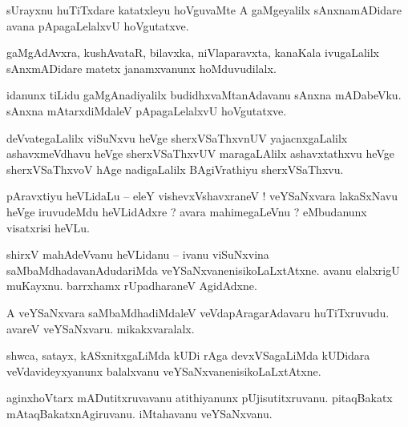 \documentclass{article}
\begin{document}
\begin{mn}%
sUrayxnu huTiTxdare katatxleyu hoVguvaMte A gaMgeyalilx sAnxnamADidare avana pApagaLelalxvU 
hoVgutatxve.
\end{mn}

\begin{mn}%
gaMgAdAvxra, kushAvataR, bilavxka, niVlaparavxta, kanaKala ivugaLalilx sAnxmADidare matetx 
janamxvanunx hoMduvudilalx.
\end{mn}

\begin{mn}%
idanunx tiLidu gaMgAnadiyalilx budidhxvaMtanAdavanu sAnxna mADabeVku. sAnxna mAtarxdiMdaleV 
pApagaLelalxvU hoVgutatxve.
\end{mn}

\begin{mn}%
deVvategaLalilx viSuNxvu heVge sherxVSaThxvnUV yajacnxgaLalilx ashavxmeVdhavu heVge sherxVSaThxvUV 
maragaLAlilx ashavxtathxvu heVge sherxVSaThxvoV hAge nadigaLalilx BAgiVrathiyu sherxVSaThxvu.
\end{mn}


\begin{mn}%
pAravxtiyu heVLidaLu -- eleY vishevxVshavxraneV ! veYSaNxvara lakaSxNavu heVge iruvudeMdu 
heVLidAdxre ? avara mahimegaLeVnu ? eMbudanunx visatxrisi heVLu.
\end{mn}

\begin{mn}%
shirxV mahAdeVvanu heVLidanu -- ivanu viSuNxvina saMbaMdhadavanAdudariMda 
veYSaNxvanenisikoLaLxtAtxne. avanu elalxrigU muKayxnu. barrxhamx rUpadharaneV AgidAdxne.
\end{mn}

\begin{mn}%
A veYSaNxvara saMbaMdhadiMdaleV veVdapAragarAdavaru huTiTxruvudu. avareV veYSaNxvaru. mikakxvaralalx.
\end{mn}

\begin{mn}%
shwca, satayx, kASxnitxgaLiMda kUDi rAga devxVSagaLiMda kUDidara veVdavideyxyanunx balalxvanu 
veYSaNxvanenisikoLaLxtAtxne.
\end{mn}

\begin{mn}%
aginxhoVtarx mADutitxruvavanu atithiyanunx pUjisutitxruvanu. pitaqBakatx mAtaqBakatxnAgiruvanu. 
iMtahavanu veYSaNxvanu.
\end{mn}
\end{document}
